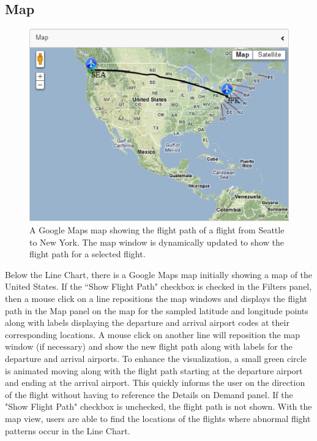 \documentclass{sig-alternate}
\begin{document}
\subsection{Map}
\label{subsec-map}
\begin{figure}
\centering
\includegraphics[width=\columnwidth]{figs/map.eps}
\caption{
	A Google Maps map showing the flight path of a flight from Seattle to New York.
The map window is dynamically updated to show the flight path for a selected 
flight.}
\label{map}
\end{figure}

Below the Line Chart, there is a Google Maps map initially showing a map of the United States.
If the ``Show Flight Path" checkbox is checked in the Filters panel, then a mouse click
on a line repositions the map windows and displays the flight path in the Map panel on the map for the sampled
latitude and longitude points along with labels displaying the departure and arrival 
airport codes at their corresponding locations. A mouse click on
another line will reposition the map window (if necessary) and show the new flight path along with
labels for the departure and arrival airports. To enhance the visualization, a small green circle
is animated moving along with the flight path starting at the departure airport and ending
at the arrival airport. This quickly informs the user on the direction of the flight
without having to reference the Details on Demand panel. If the "Show Flight Path" checkbox
is unchecked, the flight path is not shown. With the map view, users are able to find the locations 
of the flights where abnormal flight patterns occur in the Line Chart. 
\end{document}
